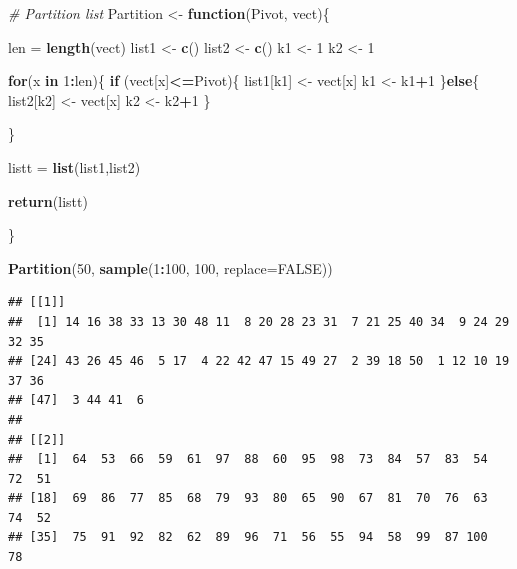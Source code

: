 \documentclass[]{article}
\newenvironment{Shaded}{\begin{snugshade}}{\end{snugshade}}
\newcommand{\KeywordTok}[1]{\textcolor[rgb]{0.13,0.29,0.53}{\textbf{#1}}}
\newcommand{\DataTypeTok}[1]{\textcolor[rgb]{0.13,0.29,0.53}{#1}}
\newcommand{\DecValTok}[1]{\textcolor[rgb]{0.00,0.00,0.81}{#1}}
\newcommand{\StringTok}[1]{\textcolor[rgb]{0.31,0.60,0.02}{#1}}
\newcommand{\CommentTok}[1]{\textcolor[rgb]{0.56,0.35,0.01}{\textit{#1}}}
\newcommand{\OtherTok}[1]{\textcolor[rgb]{0.56,0.35,0.01}{#1}}
\newcommand{\ControlFlowTok}[1]{\textcolor[rgb]{0.13,0.29,0.53}{\textbf{#1}}}
\newcommand{\OperatorTok}[1]{\textcolor[rgb]{0.81,0.36,0.00}{\textbf{#1}}}
\newcommand{\NormalTok}[1]{#1}
\begin{document}
\begin{Shaded}
\begin{Highlighting}[]
\CommentTok{# Partition list}
\NormalTok{Partition <-}\StringTok{ }\ControlFlowTok{function}\NormalTok{(Pivot, vect)\{}
  
\NormalTok{  len =}\StringTok{ }\KeywordTok{length}\NormalTok{(vect)}
\NormalTok{  list1 <-}\StringTok{ }\KeywordTok{c}\NormalTok{()}
\NormalTok{  list2 <-}\StringTok{ }\KeywordTok{c}\NormalTok{()}
\NormalTok{  k1 <-}\StringTok{ }\DecValTok{1}
\NormalTok{  k2 <-}\StringTok{ }\DecValTok{1}
  
  \ControlFlowTok{for}\NormalTok{(x }\ControlFlowTok{in} \DecValTok{1}\OperatorTok{:}\NormalTok{len)\{}
    \ControlFlowTok{if}\NormalTok{ (vect[x]}\OperatorTok{<=}\NormalTok{Pivot)\{}
\NormalTok{      list1[k1] <-}\StringTok{ }\NormalTok{vect[x]}
\NormalTok{      k1 <-}\StringTok{ }\NormalTok{k1}\OperatorTok{+}\DecValTok{1}
\NormalTok{    \}}\ControlFlowTok{else}\NormalTok{\{}
\NormalTok{      list2[k2] <-}\StringTok{ }\NormalTok{vect[x]}
\NormalTok{      k2 <-}\StringTok{ }\NormalTok{k2}\OperatorTok{+}\DecValTok{1}
\NormalTok{    \}}
    
\NormalTok{  \}}
  
\NormalTok{  listt =}\StringTok{ }\KeywordTok{list}\NormalTok{(list1,list2)}
  
  \KeywordTok{return}\NormalTok{(listt)}
  
\NormalTok{\}}

\KeywordTok{Partition}\NormalTok{(}\DecValTok{50}\NormalTok{, }\KeywordTok{sample}\NormalTok{(}\DecValTok{1}\OperatorTok{:}\DecValTok{100}\NormalTok{, }\DecValTok{100}\NormalTok{, }\DataTypeTok{replace=}\OtherTok{FALSE}\NormalTok{))}
\end{Highlighting}
\end{Shaded}

\begin{verbatim}
## [[1]]
##  [1] 14 16 38 33 13 30 48 11  8 20 28 23 31  7 21 25 40 34  9 24 29 32 35
## [24] 43 26 45 46  5 17  4 22 42 47 15 49 27  2 39 18 50  1 12 10 19 37 36
## [47]  3 44 41  6
## 
## [[2]]
##  [1]  64  53  66  59  61  97  88  60  95  98  73  84  57  83  54  72  51
## [18]  69  86  77  85  68  79  93  80  65  90  67  81  70  76  63  74  52
## [35]  75  91  92  82  62  89  96  71  56  55  94  58  99  87 100  78
\end{verbatim}
\end{document}
